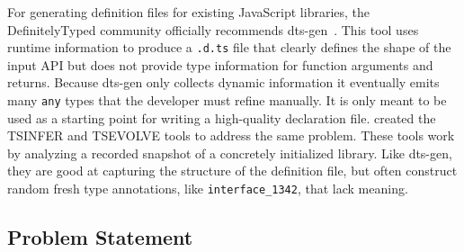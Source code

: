 \documentclass[sigplan,10pt,review,anonymous]{acmart} %
\theoremstyle{plain}
\theoremstyle{remark}
\theoremstyle{definition}
\begin{document}
%
For generating definition files for existing JavaScript libraries,
the DefinitelyTyped
community officially recommends dts-gen~\citep{dtsgen}.
This tool uses runtime information to produce a \lstinline{.d.ts} file that
clearly defines the shape of the input API but does not provide type information for
function arguments and returns. Because dts-gen only collects
dynamic information it eventually emits many \texttt{any} types that the developer must refine manually.
It is only meant to be used as a starting
point for writing a high-quality declaration file.
\citet{tstools2017} created the TSINFER and TSEVOLVE tools to address the same problem.
These tools work by analyzing a recorded snapshot of a concretely initialized library.
Like dts-gen, they are good at capturing the structure of the definition file,
but often construct random fresh type annotations, like \lstinline{interface_1342}, that lack meaning.

\subsection{Problem Statement}\label{ssec:problem}
% 


\end{document}
